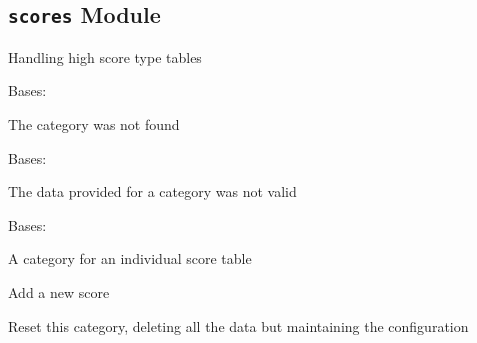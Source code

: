 \documentclass[letterpaper,10pt,english]{sphinxmanual}
\begin{document}
\subsection{\texttt{scores} Module}
\label{blocks:module-serge.blocks.scores}\label{blocks:scores-module}
Handling high score type tables

\begin{fulllineitems}
\label{blocks:serge.blocks.scores.BadCategory}
Bases: 

The category was not found

\end{fulllineitems}


\begin{fulllineitems}
\label{blocks:serge.blocks.scores.BadData}
Bases: 

The data provided for a category was not valid

\end{fulllineitems}


\begin{fulllineitems}
\label{blocks:serge.blocks.scores.Category}
Bases: 

A category for an individual score table

\begin{fulllineitems}
\label{blocks:serge.blocks.scores.Category.addScore}
Add a new score

\end{fulllineitems}


\begin{fulllineitems}
\label{blocks:serge.blocks.scores.Category.resetCategory}
Reset this category, deleting all the data but maintaining the configuration

\end{fulllineitems}


\end{fulllineitems}
\end{document}
